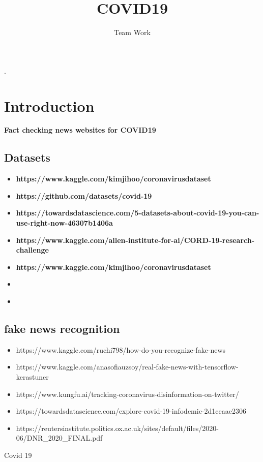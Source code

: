 \documentclass[a4paper,10pt]{article}
\title{COVID19}
\author{Team Work}
\begin{document}
\maketitle

\tableofcontents

\medskip
 \cite{latexcompanion,knuthwebsite}. 

\section{Introduction}
\textbf{Fact checking news websites for COVID19}
\subsection{Datasets}
\begin{itemize}
\item \textbf{https://www.kaggle.com/kimjihoo/coronavirusdataset}
\item \textbf{https://github.com/datasets/covid-19}
\item \textbf{https://towardsdatascience.com/5-datasets-about-covid-19-you-can-use-right-now-46307b1406a}
\item \textbf{https://www.kaggle.com/allen-institute-for-ai/CORD-19-research-challenge}
\item \textbf{https://www.kaggle.com/kimjihoo/coronavirusdataset}
\item \textbf{}
\item \textbf{}
\end{itemize}
\subsection{fake news recognition}
\begin{itemize}
\item https://www.kaggle.com/ruchi798/how-do-you-recognize-fake-news
\item https://www.kaggle.com/anasofiauzsoy/real-fake-news-with-tensorflow-kerastuner
\item https://www.kungfu.ai/tracking-coronavirus-disinformation-on-twitter/
\item https://towardsdatascience.com/explore-covid-19-infodemic-2d1ceaae2306~\cite{einstein}
\item https://reutersinstitute.politics.ox.ac.uk/sites/default/files/2020-06/DNR_2020_FINAL.pdf
\end{itemize}

Covid 19~\cite{xuetwitter, elhadad2020covid, ahmed2020covid, apuke2020fake, calvillo2020political, naeem2020exploration,o2020going, orso2020infodemic, shahi2020fakecovid} 
\end{document}
